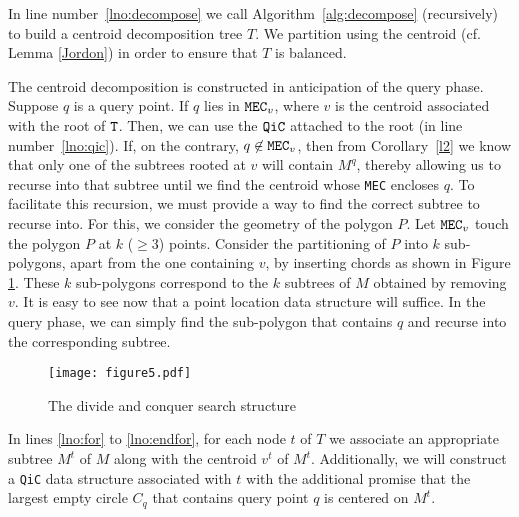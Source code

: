 \documentclass[12pt]{llncs}
\begin{document}
In line number\ \ref{lno:decompose} we call Algorithm\ \ref{alg:decompose} 
(recursively) to build  a centroid decomposition tree $T$. We partition   using the 
centroid (cf. Lemma \ref{Jordon}) in order to ensure that $T$ is balanced. 

The centroid decomposition is constructed in anticipation of the query phase. Suppose $q$ is a query point. If $q$ lies in  ${\tt MEC}_v$, where $v$ is  the centroid  associated with the root of ${\tt T}$. Then, we can use the ${\tt QiC}$ attached  to the root (in line number\ \ref{lno:qic}). If, on the contrary, $q \not \in {\tt MEC}_v$, then 
from Corollary\ \ref{l2} we know that only one of the 
subtrees rooted at $v$ will contain $M^q$, thereby allowing us to recurse into that 
subtree until we find the centroid whose {\tt MEC} encloses $q$. To facilitate this recursion, we must provide a way to find the correct subtree 
to recurse into. For this, we consider the geometry of the polygon $P$. Let ${\tt MEC}
_v$ touch the polygon $P$ at $k$ 
($\geq 3$) 
points. Consider the partitioning of  $P$ into $k$ sub-polygons, apart 
from the 
one containing $v$, by inserting chords as shown in Figure \ref{recursion}. These 
$k$ sub-polygons correspond to the $k$ subtrees of $M$ obtained by removing $v$. It is easy to 
see now that a point location data structure will suffice. In the query phase, 
we can simply find the sub-polygon that contains $q$ and recurse into the 
corresponding subtree.



\begin{figure}
\centering
\texttt{[image: figure5.pdf]}
\caption{The divide and conquer search structure}
\label{recursion}
\end{figure}



In lines \ref{lno:for} to \ref{lno:endfor}, for each node $t$ of $T$ we
associate an appropriate subtree $M^t$ of $M$ along with the centroid $v^t$ of $M^t
$. Additionally, we will construct a {\tt QiC} data structure associated with $t$ with the 
additional promise that the largest empty circle $C_q$ that contains query point $q$ is 
centered on $M^t$. 
\end{document}
